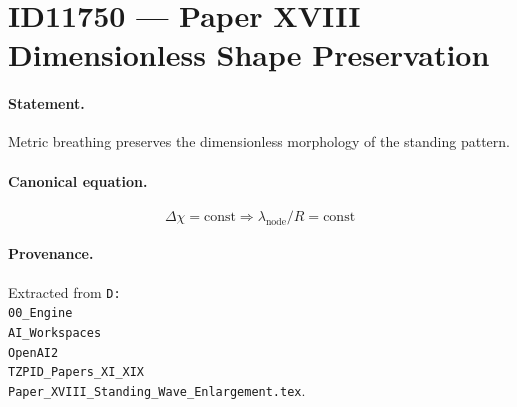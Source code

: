 \section*{ID11750 --- Paper XVIII Dimensionless Shape Preservation}

\paragraph{Statement.}
Metric breathing preserves the dimensionless morphology of the standing pattern.

\paragraph{Canonical equation.}
\[
\Delta\chi=\mathrm{const}\Rightarrow \lambda_{\mathrm{node}}/R=\mathrm{const}
\]

\paragraph{Provenance.}
Extracted from \texttt{D:\\00\_Engine\\AI\_Workspaces\\OpenAI2\\TZPID\_Papers\_XI\_XIX\\Paper\_XVIII\_Standing\_Wave\_Enlargement.tex}.
